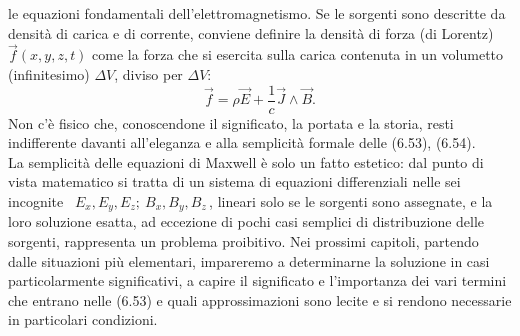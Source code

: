 le equazioni fondamentali dell'elettromagnetismo. Se le sorgenti sono descritte
da densit\`a di carica e di corrente, conviene definire la densit\`a di forza
(di Lorentz) $\vec f(x,y,z,t)$ come la forza che si esercita sulla carica
contenuta in un volumetto (infinitesimo) $\Delta V$, diviso per $\Delta V$:
\begin{equation}
  \vec f=\rho\vec E+\frac{1}{c}\vec J\wedge\vec B.
  \tag{6.54}
\end{equation}
Non c'\`e fisico che, conoscendone il significato, la portata e la storia, resti
indifferente davanti all'eleganza e alla semplicit\`a formale delle (6.53),
(6.54).\\
La semplicit\`a delle equazioni di Maxwell \`e solo un fatto estetico: dal punto
di vista matematico si tratta di un sistema di equazioni differenziali nelle sei
incognite \ $E_x,E_y,E_z;\ B_x,B_y,B_z$\,, lineari solo se le sorgenti sono
assegnate, e la loro soluzione esatta, ad eccezione di pochi casi semplici di
distribuzione delle sorgenti, rappresenta un problema proibitivo. Nei prossimi
capitoli, partendo dalle situazioni pi\`u elementari, impareremo a determinarne
la soluzione in casi particolarmente significativi, a capire il significato e
l'importanza dei vari termini che entrano nelle (6.53) e quali approssimazioni
sono lecite e si rendono necessarie in particolari condizioni.
